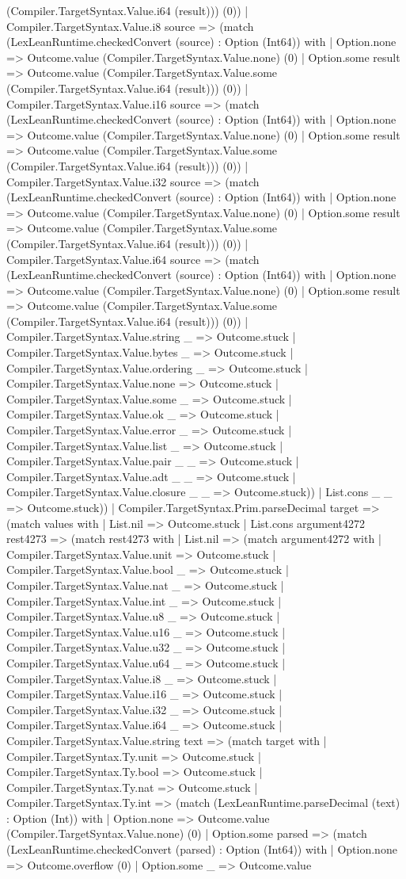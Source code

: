 \documentclass[11pt]{article}
\begin{document}
(Compiler.TargetSyntax.Value.i64 (result))) (0)) | Compiler.TargetSyntax.Value.i8 source => (match (LexLeanRuntime.checkedConvert (source) : Option (Int64)) with | Option.none => Outcome.value (Compiler.TargetSyntax.Value.none) (0) | Option.some result => Outcome.value (Compiler.TargetSyntax.Value.some (Compiler.TargetSyntax.Value.i64 (result))) (0)) | Compiler.TargetSyntax.Value.i16 source => (match (LexLeanRuntime.checkedConvert (source) : Option (Int64)) with | Option.none => Outcome.value (Compiler.TargetSyntax.Value.none) (0) | Option.some result => Outcome.value (Compiler.TargetSyntax.Value.some (Compiler.TargetSyntax.Value.i64 (result))) (0)) | Compiler.TargetSyntax.Value.i32 source => (match (LexLeanRuntime.checkedConvert (source) : Option (Int64)) with | Option.none => Outcome.value (Compiler.TargetSyntax.Value.none) (0) | Option.some result => Outcome.value (Compiler.TargetSyntax.Value.some (Compiler.TargetSyntax.Value.i64 (result))) (0)) | Compiler.TargetSyntax.Value.i64 source => (match (LexLeanRuntime.checkedConvert (source) : Option (Int64)) with | Option.none => Outcome.value (Compiler.TargetSyntax.Value.none) (0) | Option.some result => Outcome.value (Compiler.TargetSyntax.Value.some (Compiler.TargetSyntax.Value.i64 (result))) (0)) | Compiler.TargetSyntax.Value.string \_ => Outcome.stuck | Compiler.TargetSyntax.Value.bytes \_ => Outcome.stuck | Compiler.TargetSyntax.Value.ordering \_ => Outcome.stuck | Compiler.TargetSyntax.Value.none => Outcome.stuck | Compiler.TargetSyntax.Value.some \_ => Outcome.stuck | Compiler.TargetSyntax.Value.ok \_ => Outcome.stuck | Compiler.TargetSyntax.Value.error \_ => Outcome.stuck | Compiler.TargetSyntax.Value.list \_ => Outcome.stuck | Compiler.TargetSyntax.Value.pair \_ \_ => Outcome.stuck | Compiler.TargetSyntax.Value.adt \_ \_ => Outcome.stuck | Compiler.TargetSyntax.Value.closure \_ \_ => Outcome.stuck)) | List.cons \_ \_ => Outcome.stuck)) | Compiler.TargetSyntax.Prim.parseDecimal target => (match values with | List.nil => Outcome.stuck | List.cons argument4272 rest4273 => (match rest4273 with | List.nil => (match argument4272 with | Compiler.TargetSyntax.Value.unit => Outcome.stuck | Compiler.TargetSyntax.Value.bool \_ => Outcome.stuck | Compiler.TargetSyntax.Value.nat \_ => Outcome.stuck | Compiler.TargetSyntax.Value.int \_ => Outcome.stuck | Compiler.TargetSyntax.Value.u8 \_ => Outcome.stuck | Compiler.TargetSyntax.Value.u16 \_ => Outcome.stuck | Compiler.TargetSyntax.Value.u32 \_ => Outcome.stuck | Compiler.TargetSyntax.Value.u64 \_ => Outcome.stuck | Compiler.TargetSyntax.Value.i8 \_ => Outcome.stuck | Compiler.TargetSyntax.Value.i16 \_ => Outcome.stuck | Compiler.TargetSyntax.Value.i32 \_ => Outcome.stuck | Compiler.TargetSyntax.Value.i64 \_ => Outcome.stuck | Compiler.TargetSyntax.Value.string text => (match target with | Compiler.TargetSyntax.Ty.unit => Outcome.stuck | Compiler.TargetSyntax.Ty.bool => Outcome.stuck | Compiler.TargetSyntax.Ty.nat => Outcome.stuck | Compiler.TargetSyntax.Ty.int => (match (LexLeanRuntime.parseDecimal (text) : Option (Int)) with | Option.none => Outcome.value (Compiler.TargetSyntax.Value.none) (0) | Option.some parsed => (match (LexLeanRuntime.checkedConvert (parsed) : Option (Int64)) with | Option.none => Outcome.overflow (0) | Option.some \_ => Outcome.value 
\end{document}
